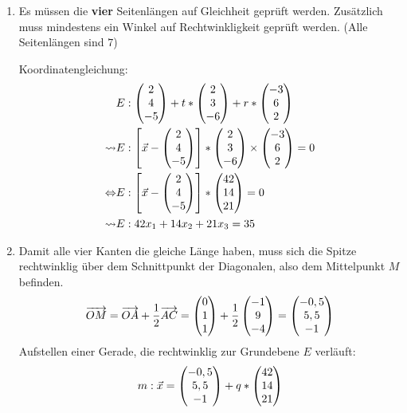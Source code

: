\begin{lsg}{}
	\begin{enumerate}
		\item Es müssen die \textbf{vier} Seitenlängen auf Gleichheit geprüft werden. Zusätzlich muss mindestens ein Winkel auf Rechtwinkligkeit geprüft werden. (Alle Seitenlängen sind $7$)

		Koordinatengleichung:
		\begin{align*}
			&E:\begin{pmatrix} 2\\4\\-5 \end{pmatrix}+t*\begin{pmatrix} 2\\3\\-6 \end{pmatrix}+r*\begin{pmatrix} -3\\6\\2 \end{pmatrix}\\
			\rightsquigarrow&E:\left[\vec x-\begin{pmatrix} 2\\4\\-5 \end{pmatrix}\right]*\begin{pmatrix} 2\\3\\-6 \end{pmatrix}\times\begin{pmatrix} -3\\6\\2 \end{pmatrix}=0\\
			\Leftrightarrow &E:\left[\vec x-\begin{pmatrix} 2\\4\\-5 \end{pmatrix}\right]*\begin{pmatrix} 42\\14\\21 \end{pmatrix}=0\\
			\rightsquigarrow&E:42x_1+14x_2+21x_3=35
		\end{align*}
		\item Damit alle vier Kanten die gleiche Länge haben, muss sich die Spitze rechtwinklig über dem Schnittpunkt der Diagonalen, also dem Mittelpunkt $M$ befinden.
		\begin{equation*}
			\overrightarrow{OM}=\overrightarrow{OA}+\frac12\overrightarrow{AC}=\begin{pmatrix} 0\\1\\1 \end{pmatrix}+\frac12\begin{pmatrix} -1\\9\\-4 \end{pmatrix}
			=\begin{pmatrix} -0,5\\5,5\\-1 \end{pmatrix}
		\end{equation*}
		Aufstellen einer Gerade, die rechtwinklig zur Grundebene $E$ verläuft:
		\begin{equation*}
			m:\vec x=\vektor{-0,5\\5,5\\-1}+q*\vektor{42\\14\\21}

\end{equation*}
\end{enumerate}
\end{lsg}
